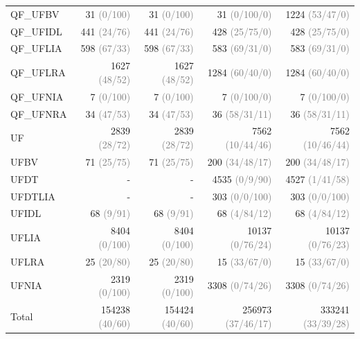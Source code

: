 \documentclass[dvipsnames,table,twoside,11pt]{article}
\newcommand{\gray}[1]{\textcolor{gray}{#1}}
\begin{document}
\begin{table}
{\begin{tabular}{lrrrr}
    QF\_UFBV & 31 \gray{(0/100)} & 31 \gray{(0/100)} & 31 \gray{(0/100/0)} & 1224 \gray{(53/47/0)}\\
    QF\_UFIDL & 441 \gray{(24/76)} & 441 \gray{(24/76)} & 428 \gray{(25/75/0)} & 428 \gray{(25/75/0)}\\
    QF\_UFLIA & 598 \gray{(67/33)} & 598 \gray{(67/33)} & 583 \gray{(69/31/0)} & 583 \gray{(69/31/0)}\\
    QF\_UFLRA & 1627 \gray{(48/52)} & 1627 \gray{(48/52)} & 1284 \gray{(60/40/0)} & 1284 \gray{(60/40/0)}\\
    QF\_UFNIA & 7 \gray{(0/100)} & 7 \gray{(0/100)} & 7 \gray{(0/100/0)} & 7 \gray{(0/100/0)}\\
    QF\_UFNRA & 34 \gray{(47/53)} & 34 \gray{(47/53)} & 36 \gray{(58/31/11)} & 36 \gray{(58/31/11)}\\
    UF & 2839 \gray{(28/72)} & 2839 \gray{(28/72)} & 7562 \gray{(10/44/46)} & 7562 \gray{(10/46/44)}\\
    UFBV & 71 \gray{(25/75)} & 71 \gray{(25/75)} & 200 \gray{(34/48/17)} & 200 \gray{(34/48/17)}\\
    UFDT & - & - & 4535 \gray{(0/9/90)} & 4527 \gray{(1/41/58)}\\
    UFDTLIA & - & - & 303 \gray{(0/0/100)} & 303 \gray{(0/0/100)}\\
    UFIDL & 68 \gray{(9/91)} & 68 \gray{(9/91)} & 68 \gray{(4/84/12)} & 68 \gray{(4/84/12)}\\
    UFLIA & 8404 \gray{(0/100)} & 8404 \gray{(0/100)} & 10137 \gray{(0/76/24)} & 10137 \gray{(0/76/23)}\\
    UFLRA & 25 \gray{(20/80)} & 25 \gray{(20/80)} & 15 \gray{(33/67/0)} & 15 \gray{(33/67/0)}\\
    UFNIA & 2319 \gray{(0/100)} & 2319 \gray{(0/100)} & 3308 \gray{(0/74/26)} & 3308 \gray{(0/74/26)}\\
    \midrule
    Total      & 154238 \gray{(40/60)} & 154424 \gray{(40/60)} & 256973 \gray{(37/46/17)} & 333241 \gray{(33/39/28)}\\
    \bottomrule
  \end{tabular}}
\end{table}
\end{document}
